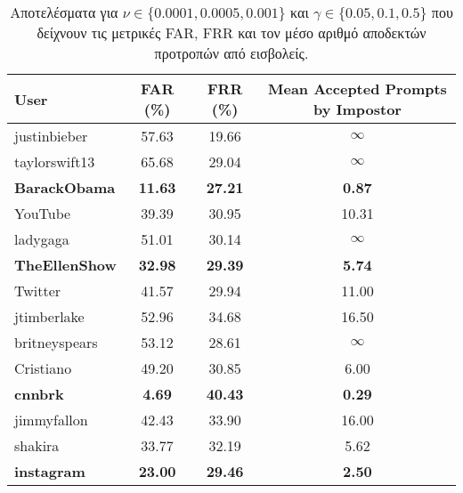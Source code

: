 \begin{table}[H]
\centering
\begin{tabular}{|l|c|c|c|}
\hline
\textbf{User} & \textbf{FAR (\%)} & \textbf{FRR (\%)} & \textbf{Mean Accepted Prompts by Impostor} \\ \hline
justinbieber & 57.63 & 19.66 & $\infty$ \\ \hline
taylorswift13 & 65.68 & 29.04 & $\infty$ \\ \hline
\textbf{BarackObama} & \textbf{11.63} & \textbf{27.21} & \textbf{0.87} \\ \hline
YouTube & 39.39 & 30.95 & 10.31 \\ \hline
ladygaga & 51.01 & 30.14 & $\infty$ \\ \hline
\textbf{TheEllenShow} & \textbf{32.98} & \textbf{29.39} & \textbf{5.74} \\ \hline
Twitter & 41.57 & 29.94 & 11.00 \\ \hline
jtimberlake & 52.96 & 34.68 & 16.50 \\ \hline
britneyspears & 53.12 & 28.61 & $\infty$ \\ \hline
Cristiano & 49.20 & 30.85 & 6.00 \\ \hline
\textbf{cnnbrk} & \textbf{4.69} & \textbf{40.43} & \textbf{0.29} \\ \hline
jimmyfallon & 42.43 & 33.90 & 16.00 \\ \hline
shakira & 33.77 & 32.19 & 5.62 \\ \hline
\textbf{instagram} & \textbf{23.00} & \textbf{29.46} & \textbf{2.50} \\ \hline
\end{tabular}
\caption{Αποτελέσματα για $\nu \in \{0.0001, 0.0005, 0.001\}$ και $\gamma \in \{0.05, 0.1, 0.5\}$ που δείχνουν τις μετρικές FAR, FRR και τον μέσο αριθμό αποδεκτών προτροπών από εισβολείς.}
\label{tab:second_grid_results}
\end{table}


